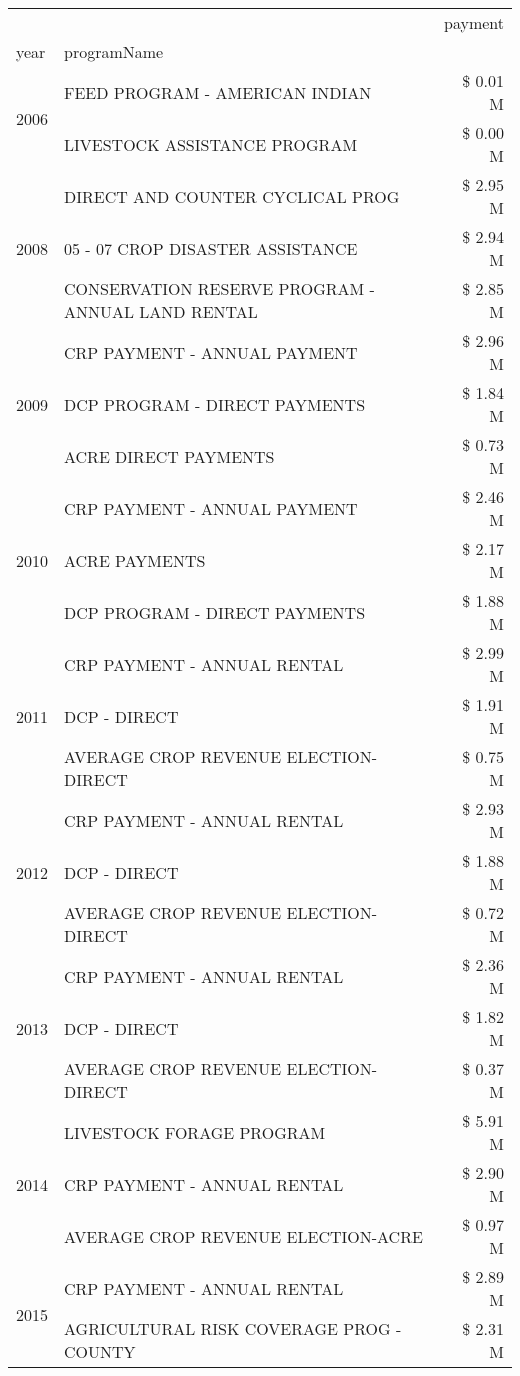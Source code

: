 \begin{tabular}{llr}
\toprule
 &  & payment \\
year & programName &  \\
\midrule
\multirow[t]{2}{*}{2006} & FEED PROGRAM - AMERICAN INDIAN & \$ 0.01 M \\
 & LIVESTOCK ASSISTANCE PROGRAM & \$ 0.00 M \\
\cline{1-3}
\multirow[t]{3}{*}{2008} & DIRECT AND COUNTER CYCLICAL PROG & \$ 2.95 M \\
 & 05 - 07 CROP DISASTER ASSISTANCE & \$ 2.94 M \\
 & CONSERVATION RESERVE PROGRAM - ANNUAL LAND RENTAL & \$ 2.85 M \\
\cline{1-3}
\multirow[t]{3}{*}{2009} & CRP PAYMENT - ANNUAL PAYMENT & \$ 2.96 M \\
 & DCP PROGRAM - DIRECT PAYMENTS & \$ 1.84 M \\
 & ACRE DIRECT PAYMENTS & \$ 0.73 M \\
\cline{1-3}
\multirow[t]{3}{*}{2010} & CRP PAYMENT - ANNUAL PAYMENT & \$ 2.46 M \\
 & ACRE PAYMENTS & \$ 2.17 M \\
 & DCP PROGRAM - DIRECT PAYMENTS & \$ 1.88 M \\
\cline{1-3}
\multirow[t]{3}{*}{2011} & CRP PAYMENT - ANNUAL RENTAL & \$ 2.99 M \\
 & DCP - DIRECT & \$ 1.91 M \\
 & AVERAGE CROP REVENUE ELECTION-DIRECT & \$ 0.75 M \\
\cline{1-3}
\multirow[t]{3}{*}{2012} & CRP PAYMENT - ANNUAL RENTAL & \$ 2.93 M \\
 & DCP - DIRECT & \$ 1.88 M \\
 & AVERAGE CROP REVENUE ELECTION-DIRECT & \$ 0.72 M \\
\cline{1-3}
\multirow[t]{3}{*}{2013} & CRP PAYMENT - ANNUAL RENTAL & \$ 2.36 M \\
 & DCP - DIRECT & \$ 1.82 M \\
 & AVERAGE CROP REVENUE ELECTION-DIRECT & \$ 0.37 M \\
\cline{1-3}
\multirow[t]{3}{*}{2014} & LIVESTOCK FORAGE PROGRAM & \$ 5.91 M \\
 & CRP PAYMENT - ANNUAL RENTAL & \$ 2.90 M \\
 & AVERAGE CROP REVENUE ELECTION-ACRE & \$ 0.97 M \\
\cline{1-3}
\multirow[t]{3}{*}{2015} & CRP PAYMENT - ANNUAL RENTAL & \$ 2.89 M \\
 & AGRICULTURAL RISK COVERAGE PROG - COUNTY & \$ 2.31 M \\

\end{tabular}
